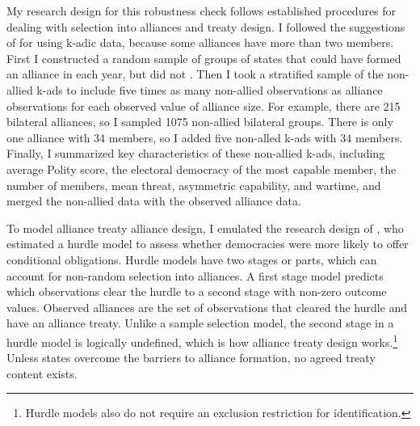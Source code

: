 \documentclass[12pt]{article}
\begin{document}
My research design for this robustness check follows established procedures for dealing with selection into alliances and treaty design. 
I followed the suggestions of \citet{Poast2010} for using k-adic data, because some alliances have more than two members. 
First I constructed a random sample of groups of states that could have formed an alliance in each year, but did not \citep{FordhamPoast2014}.
Then I took a stratified sample of the non-allied k-ads to include five times as many non-allied observations as alliance observations for each observed value of alliance size. 
For example, there are 215 bilateral alliances, so I sampled 1075 non-allied bilateral groups. 
There is only one alliance with 34 members, so I added five non-alled k-ads with 34 members. 
Finally, I summarized key characteristics of these non-allied k-ads, including average Polity score, the electoral democracy of the most capable member, the number of members, mean threat, asymmetric capability, and wartime, and merged the non-allied data with the observed alliance data. 


To model alliance treaty alliance design, I emulated the research design of \citet{Chibaetal2015}, who estimated a hurdle model to assess whether democracies were more likely to offer conditional obligations.
Hurdle models have two stages or parts, which can account for non-random selection into alliances.
A first stage model predicts which observations clear the hurdle to a second stage with non-zero outcome values. 
Observed alliances are the set of observations that cleared the hurdle and have an alliance treaty. 
Unlike a sample selection model, the second stage in a hurdle model is logically undefined, which is how alliance treaty design works.\footnote{Hurdle models also do not require an exclusion restriction for identification.} 
Unless states overcome the barriers to alliance formation, no agreed treaty content exists. 
\end{document}
